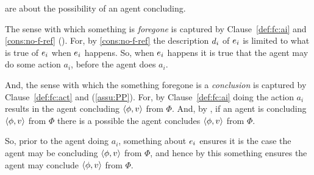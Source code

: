 \begin{note}
   are about the possibility of an agent concluding.

  The sense with which something is \emph{foregone} is captured by Clause~\ref{def:fc:ai} and \autoref{cons:no-f-ref} ().
  For, by \autoref{cons:no-f-ref} the description \(d\sb{i}\) of \(e\sb{i}\) is limited to what is true of \(e\sb{i}\) when \(e\sb{i}\) happens.
  So, when \(e\sb{i}\) happens it is true that the agent may do some action \(a_{i}\), before the agent does \(a_{i}\).

  And, the sense with which the something foregone is a \emph{conclusion} is captured by Clause~\ref{def:fc:act} and \assuPP{} (\autoref{assu:PP}).
  For, by Clause~\ref{def:fc:ai} doing the action \(a_{i}\) results in the agent concluding \(\langle\phi, v\rangle\) from \(\Phi\).
  And, by \assuPP{}, if an agent is concluding \(\langle\phi, v\rangle\) from \(\Phi\) there is a possible  the agent concludes \(\langle\phi, v\rangle\) from \(\Phi\).

  So, prior to the agent doing \(a_{i}\), something about \(e\sb{i}\) ensures it is the case the agent may be concluding \(\langle\phi, v\rangle\) from \(\Phi\), and hence by \assuPP{} this something ensures the agent may conclude \(\langle\phi, v\rangle\) from \(\Phi\).
\end{note}

